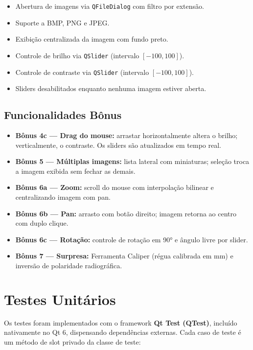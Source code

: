 \documentclass[12pt, a4paper]{article}
\begin{document}
\begin{itemize}
  \item Abertura de imagens via \texttt{QFileDialog} com filtro por extensão.
  \item Suporte a BMP, PNG e JPEG.
  \item Exibição centralizada da imagem com fundo preto.
  \item Controle de brilho via \texttt{QSlider} (intervalo $[-100, 100]$).
  \item Controle de contraste via \texttt{QSlider} (intervalo $[-100, 100]$).
  \item Sliders desabilitados enquanto nenhuma imagem estiver aberta.
\end{itemize}

\subsection{Funcionalidades Bônus}

\begin{itemize}
  \item \textbf{Bônus 4c --- Drag do mouse:} arrastar horizontalmente altera
        o brilho; verticalmente, o contraste. Os sliders são atualizados
        em tempo real.
  \item \textbf{Bônus 5 --- Múltiplas imagens:} lista lateral com miniaturas;
        seleção troca a imagem exibida sem fechar as demais.
  \item \textbf{Bônus 6a --- Zoom:} scroll do mouse com interpolação bilinear e centralizando imagem com pan.
  \item \textbf{Bônus 6b --- Pan:} arrasto com botão direito; imagem retorna ao
        centro com duplo clique.
  \item \textbf{Bônus 6c --- Rotação:} controle de rotação em 90° e ângulo
        livre por slider.
  \item \textbf{Bônus 7 --- Surpresa:} Ferramenta Caliper (régua calibrada em
        mm) e inversão de polaridade radiográfica.
\end{itemize}

\section{Testes Unitários}

Os testes foram implementados com o framework \textbf{Qt Test (QTest)},
incluído nativamente no Qt 6, dispensando dependências externas. Cada caso de
teste é um método de slot privado da classe de teste:
\end{document}
